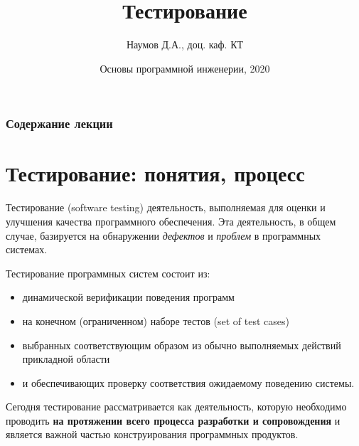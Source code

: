 \documentclass[xcolor=table]{beamer}
\title[Software Design]{Тестирование}
\author{Наумов Д.А., доц. каф. КТ}
\date[08.11.2020] {Основы программной инженерии, 2020}
\begin{document}
\begin{frame}
  \titlepage
\end{frame}
  
\begin{frame}
  \frametitle{Содержание лекции}
  \tableofcontents  
\end{frame}

\section{Тестирование: понятия, процесс}

\begin{frame}
	\linespread{1.0}
	\begin{block}{Тестирование (software testing)}
		деятельность, выполняемая для оценки и улучшения качества программного обеспечения. Эта деятельность, в общем случае, базируется на обнаружении \textit{дефектов} и \textit{проблем} в программных системах.
	\end{block}

	Тестирование программных систем состоит из:
	\begin{itemize}
		\item динамической верификации поведения программ 
		\item на конечном (ограниченном) наборе тестов (set of test cases)
		\item выбранных соответствующим образом из обычно выполняемых действий прикладной области
		\item и обеспечивающих проверку соответствия ожидаемому поведению системы.
	\end{itemize}
	Сегодня тестирование рассматривается как деятельность, которую необходимо проводить \textbf{на протяжении всего процесса разработки и сопровождения} и является важной частью конструирования программных продуктов.
\end{frame}
\end{document}
